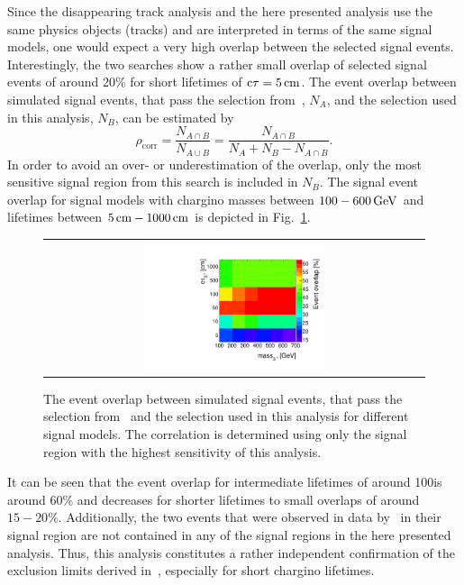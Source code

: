 Since the disappearing track analysis and the here presented analysis use the same physics objects (tracks) and are interpreted in terms of the same signal models, one would expect a very high overlap between the selected signal events.
Interestingly, the two searches show a rather small overlap of selected signal events of around 20\% for short lifetimes of $\text{c}\tau=5\,\text{cm}$.
The event overlap between simulated signal events, that pass the selection from~\cite{bib:CMS:DT_8TeV}, $N_A$, and the selection used in this analysis, $N_B$, can be estimated by
\begin{equation*}
\rho_{\text{corr}} = \frac{N_{A\cap B}}{N_{A \cup B}} = \frac{N_{A\cap B}}{N_A + N_B - N_{A \cap B}}.
\end{equation*}
In order to avoid an over- or underestimation of the overlap, only the most sensitive signal region from this search is included in $N_B$.
The signal event overlap for signal models with chargino masses between $100-600\,\text{Ge}\kern-0.06667em\text{V}$ and lifetimes between $5\,\text{cm}-1000\,\text{cm}$ is depicted in Fig.~\ref{fig:AnalysisOverlap}.
\begin{figure}[!t]
  \centering 
  \begin{tabular}{c}
    \includegraphics[width=0.49\textwidth]{figures/analysis/Interpretation/AnalysisOverlap.pdf}  
  \end{tabular}
  \caption{The event overlap between simulated signal events, that pass the selection from~\cite{bib:CMS:DT_8TeV} and the selection used in this analysis for different signal models.
          The correlation is determined using only the signal region with the highest sensitivity of this analysis.}
  \label{fig:AnalysisOverlap}
\end{figure} 
It can be seen that the event overlap for intermediate lifetimes of around 100\cm is around 60\% and decreases for shorter lifetimes to small overlaps of around $15-20\%$.
Additionally, the two events that were observed in data by~\cite{bib:CMS:DT_8TeV} in their signal region are not contained in any of the signal regions in the here presented analysis.
Thus, this analysis constitutes a rather independent confirmation of the exclusion limits derived in~\cite{bib:CMS:DT_8TeV}, especially for short chargino lifetimes.

